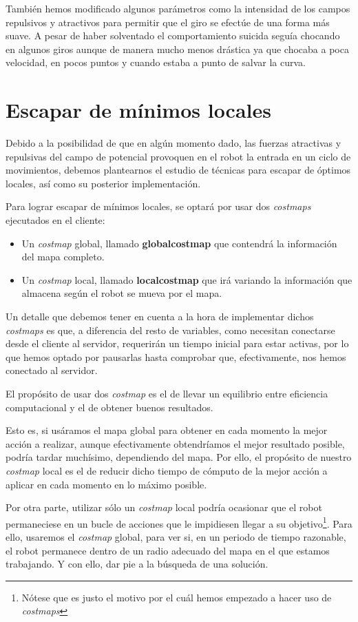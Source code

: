 \documentclass[a4paper, 11pt]{article}
\begin{document}
	También hemos modificado algunos parámetros como la intensidad de los campos repulsivos y atractivos
	para permitir que el giro se efectúe de una forma más suave. A pesar de haber solventado el
	comportamiento suicida seguía chocando en algunos giros aunque de manera mucho menos drástica ya
	que chocaba a poca velocidad, en pocos puntos y cuando estaba a punto de salvar la curva.

\section{Escapar de mínimos locales}
	Debido a la posibilidad de que en algún momento dado, las fuerzas atractivas y repulsivas del campo
	de potencial provoquen en el robot la entrada en un ciclo de movimientos, debemos plantearnos el
	estudio de técnicas para escapar de óptimos locales, así como su posterior implementación.
	
	Para lograr escapar de mínimos locales, se optará por usar dos \textit{costmaps} ejecutados en el
	cliente:
	
	\begin{itemize}
		\item Un \textit{costmap} global, llamado \textbf{globalcostmap} que contendrá la información
		del mapa completo.
		\item Un \textit{costmap} local, llamado \textbf{localcostmap} que irá variando la información
		que almacena según el robot se mueva por el mapa.
	\end{itemize}
	
	Un detalle que debemos tener en cuenta a la hora de implementar dichos \textit{costmaps} es que,
	a diferencia del resto de variables, como necesitan conectarse desde el cliente al servidor, requerirán
	un tiempo inicial para estar activas, por lo que hemos optado por pausarlas hasta comprobar que,
	efectivamente, nos hemos conectado al servidor.

	El propósito de usar dos \textit{costmap} es el de llevar un equilibrio entre eficiencia computacional
	y el de obtener buenos resultados.
	
	Esto es, si usáramos el mapa global para obtener en cada momento la mejor acción a realizar, aunque
	efectivamente obtendríamos el mejor resultado posible, podría tardar muchísimo, dependiendo del mapa.
	Por ello, el propósito de nuestro \textit{costmap} local es el de reducir dicho tiempo de cómputo de
	la mejor acción a aplicar en cada momento en lo máximo posible.
	
	Por otra parte, utilizar sólo un \textit{costmap} local podría ocasionar que el robot permaneciese en
	un bucle de acciones que le impidiesen llegar a su objetivo\footnote{Nótese que es justo el motivo
	por el cuál hemos empezado a hacer uso de \textit{costmaps}}. Para ello, usaremos el \textit{costmap}
	global, para ver si, en un periodo de tiempo razonable, el robot permanece dentro de un radio adecuado
	del mapa en el que estamos trabajando. Y con ello, dar pie a la búsqueda de una solución.
		
\end{document}
